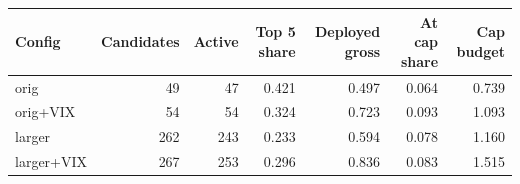\begin{tabular}{lrrrrrr}
\toprule
Config & Candidates & Active & Top 5 share & Deployed gross & At cap share & Cap budget \\
\midrule
orig & 49 & 47 & 0.421 & 0.497 & 0.064 & 0.739 \\
orig+VIX & 54 & 54 & 0.324 & 0.723 & 0.093 & 1.093 \\
larger & 262 & 243 & 0.233 & 0.594 & 0.078 & 1.160 \\
larger+VIX & 267 & 253 & 0.296 & 0.836 & 0.083 & 1.515 \\
\bottomrule
\end{tabular}
